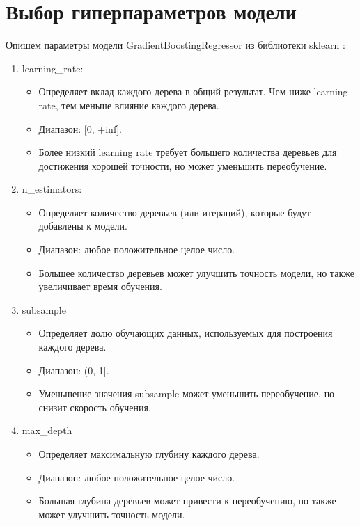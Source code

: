 \section{Выбор гиперпараметров модели}

Опишем параметры модели GradientBoostingRegressor из библиотеки sklearn \cite{bib:sklearn}:
\begin{enumerate}
    \item learning\_rate: 
    \begin{itemize}
        \item Определяет вклад каждого дерева в общий результат. Чем ниже learning rate, тем меньше влияние каждого дерева.
        \item Диапазон: [0, +inf].
        \item Более низкий learning rate требует большего количества деревьев для достижения хорошей точности, но может уменьшить переобучение.
    \end{itemize}

    \item n\_estimators:
    \begin{itemize}
        \item Определяет количество деревьев (или итераций), которые будут добавлены к модели.
        \item Диапазон: любое положительное целое число.
        \item Большее количество деревьев может улучшить точность модели, но также увеличивает время обучения.
    \end{itemize}
    \item subsample
    \begin{itemize}
        \item Определяет долю обучающих данных, используемых для построения каждого дерева.
        \item Диапазон: (0, 1].
        \item Уменьшение значения subsample может уменьшить переобучение, но снизит скорость обучения.
    \end{itemize}
    \item max\_depth
    \begin{itemize}
        \item Определяет максимальную глубину каждого дерева.
        \item Диапазон: любое положительное целое число.
        \item Большая глубина деревьев может привести к переобучению, но также может улучшить точность модели.
    \end{itemize}
\end{enumerate}

